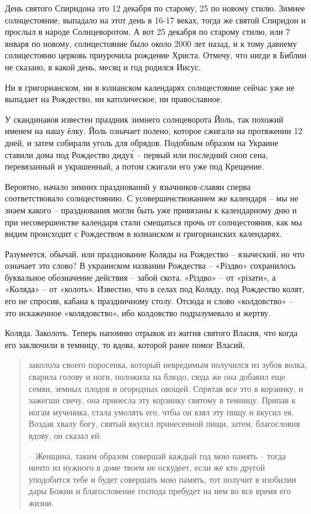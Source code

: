    День святого Спиридона это 12 декабря по старому, 25 по новому стилю. Зимнее солнцестояние, выпадало на этот день в 16-17 веках, тогда же святой Спиридон и прослыл в народе Солнцеворотом. А вот 25 декабря по старому стилю, или 7 января по новому, солнцестояние было около 2000 лет назад, и к тому давнему солнцестояню церковь приурочила рождение Христа. Отмечу, что нигде в Библии не сказано, в какой день, месяц и год родился Иисус.

   Ни в григорианском, ни в юлианском календарях солнцестояние сейчас уже не выпадает на Рождество, ни католическое, ни православное.

   У скандинавов известен праздник зимнего солнцеворота Йоль, так похожий именем на нашу ёлку. Йоль означает полено, которое сжигали на протяжении 12 дней, и затем собирали уголь для обрядов. Подобным образом на Украине ставили дома под Рождество диду\'х – первый или последний сноп сена, перевязанный и украшенный, а потом сжигали его уже под Крещение.

   Вероятно, начало зимних празднований у язычников-славян сперва соответствовало  солнцестоянию. С усовершенствованием же календаря – мы не знаем какого – празднования могли быть уже привязаны к календарному дню и при несовершенстве календаря стали смещаться прочь от солнцестояния, как мы видим происходит с Рождеством в юлианском и григорианских календарях.

   Разумеется, обычай, или празднование Коляды на Рождество – языческий, но что означает это слово? В украинском названии
Рождества – «Різдво» сохранилось буквальное обозначение действия – забой скота. «Різдво» – от «різати», а «Коляда» – от «колоть». Известно, что в селах под Коляду, под Рождество колят, его не спросив, кабана к праздничному столу. Отсюда и слово «колдовство» – это искаженное «колядовство», ибо колдовство подразумевало и жертву.

   Коляда. Заколоть. Теперь напомню отрывок из жития святого Власия, что когда его заключили в темницу, то вдова, которой ранее помог Власий,

\begin{quotation}
заколола своего поросенка, который невредимым получился из зубов волка, сварила голову и ноги, положила на блюдо, сюда же она добавил еще семян, земных плодов и огородных овощей. Спрятав все это в корзинку, и зажегши свечу, она принесла эту корзинку святому в темницу. Припав к ногам мученика, стала умолять его, чтбы он взял эту пищу и вкусил ея. Воздав хвалу богу, святый вкусил принесенной пищи, затем, благословив вдову, он сказал ей:

 – Женщина, таким образом совершай каждый год мою память – тогда ничто из нужного в доме твоем не оскудеет, если же кто другой уподобится тебе и будет совершать мою память, тот получит в изобилии дары Божии и благословение господа пребудет на нем во все время его жизни.
\end{quotation}

